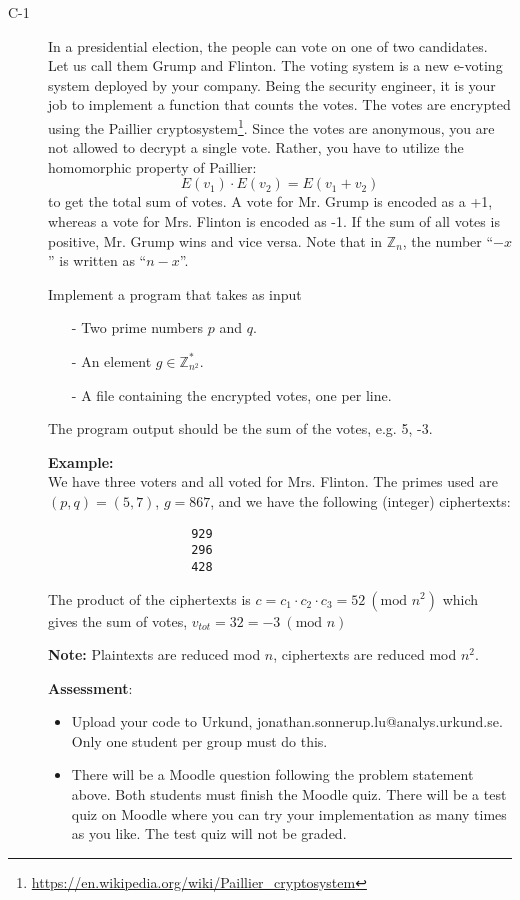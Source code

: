 \documentclass{article}
\begin{document}
			\begin{description}
				\item[C-1]{In a presidential election, the people can vote on one of two candidates. Let us call them Grump and Flinton. The voting system is a new e-voting system deployed by your company. Being the
					security engineer, it is your job to implement a function that counts the votes. The votes are encrypted
					using the Paillier cryptosystem\footnote{\url{https://en.wikipedia.org/wiki/Paillier_cryptosystem}}. Since the votes are anonymous, you are not allowed to decrypt a single vote.
					Rather, you have to utilize the homomorphic property of Paillier:
					\[
					E(v_1) \cdot E(v_2) = E(v_1 + v_2)
					\]	
					to get the total sum of votes. A vote for Mr. Grump is encoded as a +1, whereas a vote for Mrs. Flinton
					is encoded as -1. If the sum of all votes is positive, Mr. Grump wins and vice versa. Note that in
					$\mathbb{Z}_n$, the number ``$-x$'' is written as ``$n-x$''.
					
					Implement a program that takes as input
					\begin{itemize}
						\item[-] Two prime numbers $p$ and $q$.
						\item[-] An element $g \in \mathbb{Z}_{n^2}^{*}$.
						\item[-] A file containing the encrypted votes, one per line.
					\end{itemize}
					
					The program output should be the sum of the votes, e.g. 5, -3.
					
					\textbf{Example:}\\
					We have three voters and all voted for Mrs. Flinton. The primes used are
					$(p, q) = (5, 7)$, $g = 867$, and we have the following (integer) ciphertexts:
					\begin{verbatim}
					929
					296
					428
					\end{verbatim}
					The product of the ciphertexts is $c = c_1 \cdot c_2 \cdot c_3 = 52 ~(\textrm{mod } n^2)$
					which gives the sum of votes, $v_{tot} = 32 = -3 ~(\textrm{mod } n)$
					
					\textbf{Note:} Plaintexts are reduced mod $n$, ciphertexts are reduced mod $n^2$.
					
					\textbf{Assessment}:
					\begin{itemize}
						\item Upload your code to Urkund, jonathan.sonnerup.lu@analys.urkund.se. Only one student per group must do this.
						\item There will be a Moodle question following the problem statement above. Both students must finish the Moodle quiz. There will be	a test quiz on Moodle where you can try your implementation as many times as you like. The test quiz will not be graded.
					\end{itemize}}
					
				\end{description}
				
\end{document}

